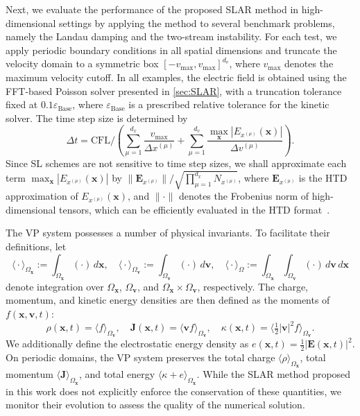 \documentclass{article}
\theoremstyle{plain}
\theoremstyle{definition}
\theoremstyle{remark}
\begin{document}
Next, we evaluate the performance of the proposed SLAR method in high-dimensional settings by applying the method to several benchmark problems, namely the Landau damping and the two-stream instability. For each test, we apply periodic boundary conditions in all spatial dimensions and truncate the velocity domain to a symmetric box \([ -v_{\max}, v_{\max} ]^{d_v}\), where \(v_{\max}\) denotes the maximum velocity cutoff. In all examples, the electric field is obtained using the FFT-based Poisson solver presented in \cref{sec:SLAR}, with a truncation tolerance fixed at $0.1\varepsilon_{\text{Base}}$, where $\varepsilon_{\text{Base}}$ is a prescribed relative tolerance for the kinetic solver. The time step size is determined by
\begin{equation}\label{eq:time_step}
\Delta t = \text{CFL}/\left(\sum_{\mu=1}^{d_x} \frac{v_{\max}}{\Delta x^{(\mu)}} + \sum_{\mu=1}^{d_v} \frac{\max_{\bm{x}} |E_{x^{(\mu)}}(\bm{x})|}{\Delta v^{(\mu)}}\right).
\end{equation}
Since SL schemes are not sensitive to time step sizes, we shall approximate each term \(\max_{\bm{x}} |E_{x^{(\mu)}}(\bm{x})|\) by \(\|\bm{E}_{x^{(\mu)}}\|/\sqrt{\prod_{\mu=1}^{d_x} N_{x^{(\mu)}}}\), where \(\bm{E}_{x^{(\mu)}}\) is the HTD approximation of \(E_{x^{(\mu)}}(\bm{x})\), and \(\|\cdot\|\) denotes the Frobenius norm of high-dimensional tensors, which can be efficiently evaluated in the HTD format~\cite{kressner2012htucker}.

The VP system possesses a number of physical invariants. To facilitate their definitions, let 
\[
    \Big\langle \cdot \Big\rangle_{\Omega_{\bm{x}}} := \int_{\Omega_{\bm{x}}} (\cdot) \,d\bm{x}, \quad
    \Big\langle \cdot \Big\rangle_{\Omega_{\bm{v}}} := \int_{\Omega_{\bm{v}}} (\cdot) \,d\bm{v}, \quad 
    \Big\langle \cdot \Big\rangle_{\Omega} := \int_{\Omega_{\bm{x}}}\int_{\Omega_{\bm{v}}} (\cdot) \,d\bm{v}\,d\bm{x}
\]
denote integration over $\Omega_{\bm{x}}$, $\Omega_{\bm{v}}$, and $\Omega_{\bm{x}}\times\Omega_{\bm{v}}$, respectively. The charge, momentum, and kinetic energy densities are then defined as the moments of $f(\bm{x}, \bm{v},t)$:
\begin{equation*}
    \rho(\bm{x},t) = \Big\langle f \Big\rangle_{\Omega_{\bm{v}}}, \quad 
    \bm{J}(\bm{x},t) = \Big\langle \bm{v} f \Big\rangle_{\Omega_{\bm{v}}}, \quad 
    \kappa(\bm{x},t) = \Big\langle \tfrac{1}{2}\left\lvert \bm{v} \right\rvert^{2} f \Big\rangle_{\Omega_{\bm{v}}}.
\end{equation*}
We additionally define the electrostatic energy density as $e(\bm{x},t) = \tfrac{1}{2}\left\lvert \bm{E}(\bm{x},t) \right\rvert^{2}$. On periodic domains, the VP system preserves the total charge $\langle \rho \rangle_{\Omega_{\bm{x}}}$, total momentum $\langle \bm{J}\rangle_{\Omega_{\bm{x}}}$, and total energy $\langle \kappa + e\rangle_{\Omega_{\bm{x}}}$. While the SLAR method proposed in this work does not explicitly enforce the conservation of these quantities, we monitor their evolution to assess the quality of the numerical solution.
\end{document}
